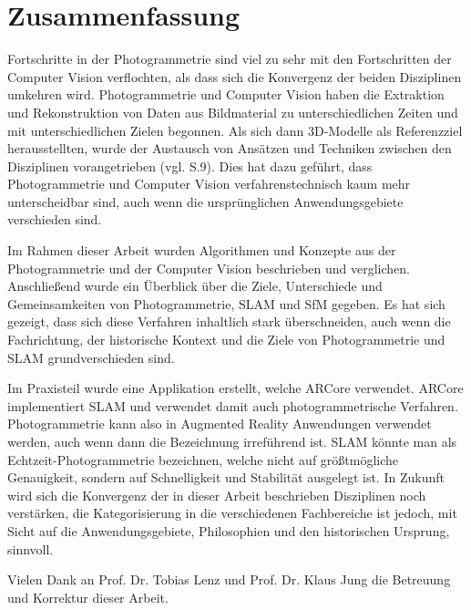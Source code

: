 \chapter{Zusammenfassung}


Fortschritte in der Photogrammetrie sind viel zu sehr mit den Fortschritten der Computer Vision verflochten, als dass sich die Konvergenz der beiden Disziplinen umkehren wird. Photogrammetrie und Computer Vision haben die Extraktion und Rekonstruktion von Daten aus Bildmaterial zu unterschiedlichen Zeiten und mit unterschiedlichen Zielen begonnen. Als sich dann 3D-Modelle als Referenzziel herausstellten, wurde der Austausch von Ansätzen und Techniken zwischen den Disziplinen vorangetrieben (vgl. \cite{state_of_art} S.9). Dies hat dazu geführt, dass Photogrammetrie und Computer Vision verfahrenstechnisch kaum mehr unterscheidbar sind, auch wenn die ursprünglichen Anwendungsgebiete verschieden sind. 

Im Rahmen dieser Arbeit wurden Algorithmen und Konzepte aus der Photogrammetrie und der Computer Vision beschrieben und verglichen. Anschließend wurde ein Überblick über die Ziele, Unterschiede und Gemeinsamkeiten von Photogrammetrie, SLAM und SfM gegeben. Es hat sich gezeigt, dass sich diese Verfahren inhaltlich stark überschneiden, auch wenn die Fachrichtung, der historische Kontext und die Ziele von Photogrammetrie und SLAM grundverschieden sind. 

Im Praxisteil wurde eine Applikation erstellt, welche ARCore verwendet. ARCore implementiert SLAM und verwendet damit auch photogrammetrische Verfahren. Photogrammetrie kann also in Augmented Reality Anwendungen verwendet werden, auch wenn dann die Bezeichnung irreführend ist. SLAM könnte man als Echtzeit-Photogrammetrie bezeichnen, welche nicht auf größtmögliche Genauigkeit, sondern auf Schnelligkeit und Stabilität ausgelegt ist. In Zukunft wird sich die Konvergenz der in dieser Arbeit beschrieben Disziplinen noch verstärken, die Kategorisierung in die verschiedenen Fachbereiche ist jedoch, mit Sicht auf die Anwendungsgebiete, Philosophien und den historischen Ursprung, sinnvoll.

Vielen Dank an Prof. Dr. Tobias Lenz und Prof. Dr. Klaus Jung die Betreuung und Korrektur dieser Arbeit.
	
